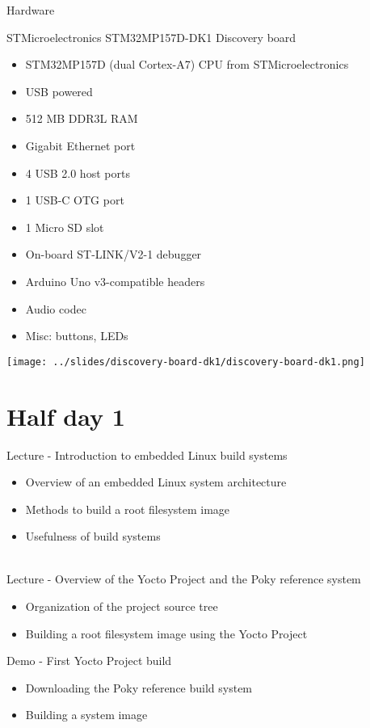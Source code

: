 \documentclass[a4paper,12pt,obeyspaces,spaces,hyphens]{article}
\begin{document}
\feagendatwocolumn
{Hardware}
{
  STMicroelectronics STM32MP157D-DK1 Discovery board
  \begin{itemize}
  \item STM32MP157D (dual Cortex-A7) CPU from STMicroelectronics
  \item USB powered
  \item 512 MB DDR3L RAM
  \item Gigabit Ethernet port
  \item 4 USB 2.0 host ports
  \item 1 USB-C OTG port
  \item 1 Micro SD slot
  \item On-board ST-LINK/V2-1 debugger
  \item Arduino Uno v3-compatible headers
  \item Audio codec
  \item Misc: buttons, LEDs
  \end{itemize}
}
{}
{
  \begin{flushright}
  \texttt{[image: ../slides/discovery-board-dk1/discovery-board-dk1.png]}
  \end{flushright}
}

\section{Half day 1}

\feagendaonecolumn
{Lecture - Introduction to embedded Linux build systems}
{
  \begin{itemize}
  \item Overview of an embedded Linux system architecture
  \item Methods to build a root filesystem image
  \item Usefulness of build systems
  \end{itemize}
}
\\
\feagendatwocolumn
{Lecture - Overview of the Yocto Project and the Poky reference system}
{
  \begin{itemize}
  \item Organization of the project source tree
  \item Building a root filesystem image using the Yocto Project
  \end{itemize}
}
{Demo - First Yocto Project build}
{
  \begin{itemize}
  \item Downloading the Poky reference build system
  \item Building a system image
 \end{itemize}
}
\end{document}
